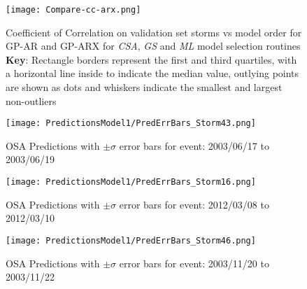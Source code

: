     \begin{figure}
    \noindent\texttt{[image: Compare-cc-arx.png]}
    \caption{Coefficient of Correlation on validation set storms vs model order for GP-AR and GP-ARX for \emph{CSA}, \emph{GS} and \emph{ML} model selection routines \\ \textbf{Key}: Rectangle borders represent the first and third quartiles, with a horizontal line inside to indicate the median value, outlying points are shown as dots and whiskers indicate the smallest and largest non-outliers}
    \label{fig:CompareCCARX}
    \end{figure}
    
    
    \begin{figure}
    \noindent\texttt{[image: PredictionsModel1/PredErrBars\_Storm43.png]}
    \caption{OSA Predictions with $\pm \sigma$ error bars for event: 2003/06/17 to 2003/06/19}
    \label{fig:ComparePred1}
    \end{figure}
    
    
    \begin{figure}
    \noindent\texttt{[image: PredictionsModel1/PredErrBars\_Storm16.png]}
    \caption{OSA Predictions with $\pm \sigma$ error bars for event: 2012/03/08 to 2012/03/10}
    \label{fig:ComparePred2}
    \end{figure}
    
    \begin{figure}
    \noindent\texttt{[image: PredictionsModel1/PredErrBars\_Storm46.png]}
    \caption{OSA Predictions with $\pm \sigma$ error bars for event: 2003/11/20 to 2003/11/22}
    \label{fig:ComparePred3}
    \end{figure}
    
    
    

